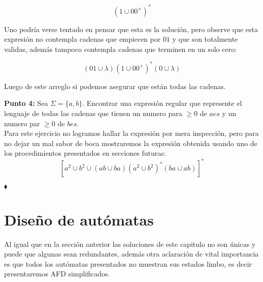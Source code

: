 \begin{itemize}
      $$(1\cup00^+)^*$$

      Uno podría verse tentado en pensar que esta es la solución, pero observe que esta expresión no contempla cadenas que empiecen por $01$ y que son totalmente validas, además tampoco contempla cadenas que terminen en un solo cero:

      $$(01\cup\lambda)(1\cup00^+)^*(0\cup\lambda)$$

      Luego de este arreglo si podemos asegurar que están todas las cadenas.
  
\end{itemize}

\textbf{Punto 4: }Sea $\Sigma=\{a,b\}$. Encontrar una expresión regular que represente el lenguaje de todas las cadenas que tienen un numero para $\geq0$ de $aes$ y un numero par $\geq0$ de $bes.$\\

Para este ejercicio no logramos hallar la expresión por mera inspección, pero para no dejar un mal sabor de boca mostraremos la expresión obtenida usando uno de los procedimientos presentados en secciones futuras:
$$[a^2\cup b^2\cup(ab\cup ba)(a^2\cup b^2)^*(ba\cup ab)]^*$$

\hfill $\blacklozenge$

\section{Diseño de autómatas}


Al igual que en la sección anterior las soluciones de este capitulo no son únicas y puede que algunas sean redundantes, además otra aclaración de vital importancia es que todos los autómatas presentados no muestran sus estados limbo, es decir presentaremos AFD simplificados.\\


